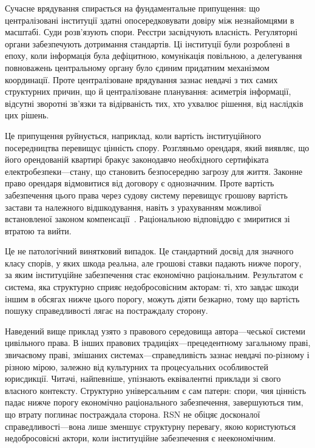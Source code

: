 \documentclass[11pt,a4paper,twocolumn]{article}
\begin{document}
Сучасне врядування спирається на фундаментальне припущення: що централізовані інституції здатні опосередковувати довіру між незнайомцями в масштабі. Суди розв'язують спори. Реєстри засвідчують власність. Регуляторні органи забезпечують дотримання стандартів. Ці інституції були розроблені в епоху, коли інформація була дефіцитною, комунікація повільною, а делегування повноважень центральному органу було єдиним придатним механізмом координації. Проте централізоване врядування зазнає невдачі з тих самих структурних причин, що й централізоване планування: асиметрія інформації, відсутні зворотні зв'язки та відірваність тих, хто ухвалює рішення, від наслідків цих рішень.

Це припущення руйнується, наприклад, коли вартість інституційного посередництва перевищує цінність спору. Розгляньмо орендаря, який виявляє, що його орендованій квартирі бракує законодавчо необхідного сертифіката електробезпеки---стану, що становить безпосередню загрозу для життя. Законне право орендаря відмовитися від договору є однозначним. Проте вартість забезпечення цього права через судову систему перевищує грошову вартість застави та належного відшкодування, навіть з урахуванням можливої встановленої законом компенсації~\cite{czcourtfees}. Раціональною відповіддю є змиритися зі втратою та вийти.

Це не патологічний винятковий випадок. Це стандартний досвід для значного класу спорів, у яких шкода реальна, але грошові ставки падають нижче порогу, за яким інституційне забезпечення стає економічно раціональним. Результатом є система, яка структурно сприяє недобросовісним акторам: ті, хто завдає шкоди іншим в обсягах нижче цього порогу, можуть діяти безкарно, тому що вартість пошуку справедливості лягає на постраждалу сторону.

Наведений вище приклад узято з правового середовища автора---чеської системи цивільного права. В інших правових традиціях---прецедентному загальному праві, звичаєвому праві, змішаних системах---справедливість зазнає невдачі по-різному і різною мірою, залежно від культурних та процесуальних особливостей юрисдикції. Читачі, найпевніше, упізнають еквівалентні приклади зі свого власного контексту. Структурно універсальним є сам патерн: спори, чия цінність падає нижче порогу економічно раціонального забезпечення, завершуються тим, що втрату поглинає постраждала сторона. RSN не обіцяє досконалої справедливості---вона лише зменшує структурну перевагу, якою користуються недобросовісні актори, коли інституційне забезпечення є неекономічним.
\end{document}
